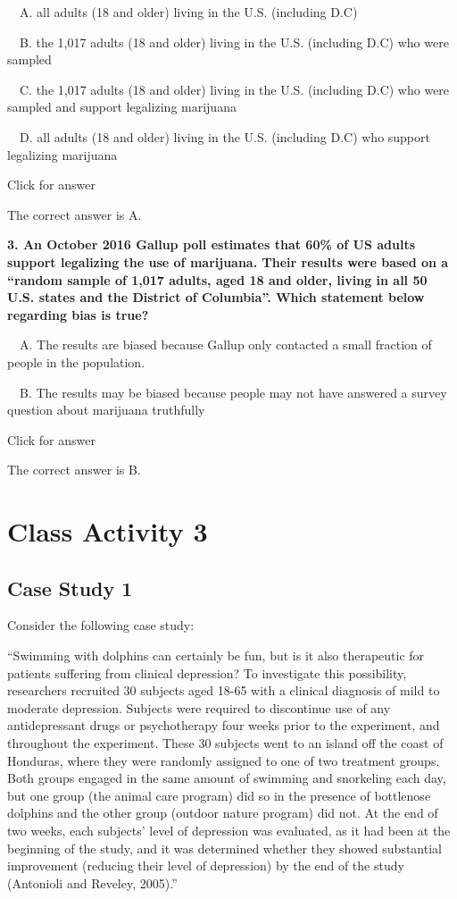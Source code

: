 \documentclass[
]{book}
\begin{document}
 A. all adults (18 and older) living in the U.S. (including D.C)

 B. the 1,017 adults (18 and older) living in the U.S. (including D.C) who were sampled

 C. the 1,017 adults (18 and older) living in the U.S. (including D.C) who were sampled and support legalizing marijuana

 D. all adults (18 and older) living in the U.S. (including D.C) who support legalizing marijuana

Click for answer

The correct answer is A.

\textbf{3. An October 2016 Gallup poll estimates that 60\% of US adults support legalizing the use of marijuana. Their results were based on a ``random sample of 1,017 adults, aged 18 and older, living in all 50 U.S. states and the District of Columbia''. Which statement below regarding bias is true?}

 A. The results are biased because Gallup only contacted a small fraction of people in the population.

 B. The results may be biased because people may not have answered a survey question about marijuana truthfully

Click for answer

The correct answer is B.

\hypertarget{class-activity-3}{%
\chapter{Class Activity 3}\label{class-activity-3}}

\hypertarget{case-study-1}{%
\section{Case Study 1}\label{case-study-1}}

Consider the following case study:

``Swimming with dolphins can certainly be fun, but is it also therapeutic for patients suffering from clinical depression? To investigate this possibility, researchers recruited 30 subjects aged 18-65 with a clinical diagnosis of mild to moderate depression. Subjects were required to discontinue use of any antidepressant drugs or psychotherapy four weeks prior to the experiment, and throughout the experiment. These 30 subjects went to an island off the coast of Honduras, where they were randomly assigned to one of two treatment groups. Both groups engaged in the same amount of swimming and snorkeling each day, but one group (the animal care program) did so in the presence of bottlenose dolphins and the other group (outdoor nature program) did not. At the end of two weeks, each subjects' level of depression was evaluated, as it had been at the beginning of the study, and it was determined whether they showed substantial improvement (reducing their level of depression) by the end of the study (Antonioli and Reveley, 2005).''
\end{document}
